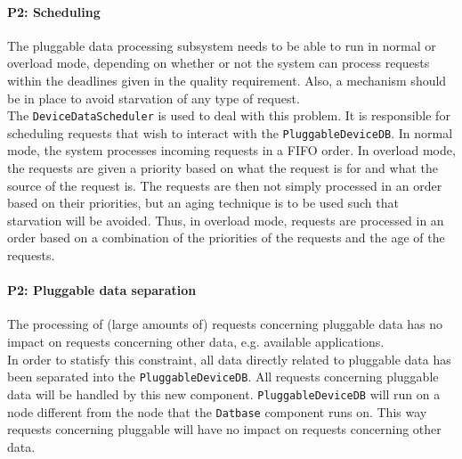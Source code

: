     \paragraph{P2: Scheduling}
        The pluggable data processing subsystem needs to be able to run in normal
        or overload mode, depending on whether or not the system can process
        requests within the deadlines given in the quality requirement. Also,
        a mechanism should be in place to avoid starvation of any type of request. \\
        The \texttt{DeviceDataScheduler} is used to deal with this problem.
        It is responsible for scheduling requests that wish to interact with
        the \texttt{PluggableDeviceDB}. In normal mode, the system processes
        incoming requests in a FIFO order. In overload mode, the requests are
        given a priority based on what the request is for and what the source
        of the request is. The requests are then not simply processed in an
        order based on their priorities, but an aging technique is to be used
        such that starvation will be avoided. Thus, in overload mode,
        requests are processed in an order based on a combination of the
        priorities of the requests and the age of the requests.

    \paragraph{P2: Pluggable data separation}
        The processing of (large amounts of) requests concerning pluggable
        data has no impact on requests concerning other data, e.g. available applications. \\
        In order to statisfy this constraint, all data directly related to
        pluggable data has been separated into the \texttt{PluggableDeviceDB}.
        All requests concerning pluggable data will be handled by this new
        component. \texttt{PluggableDeviceDB} will run on a node different
        from the node that the \texttt{Datbase} component runs on. This way
        requests concerning pluggable will have no impact on
        requests concerning other data.

